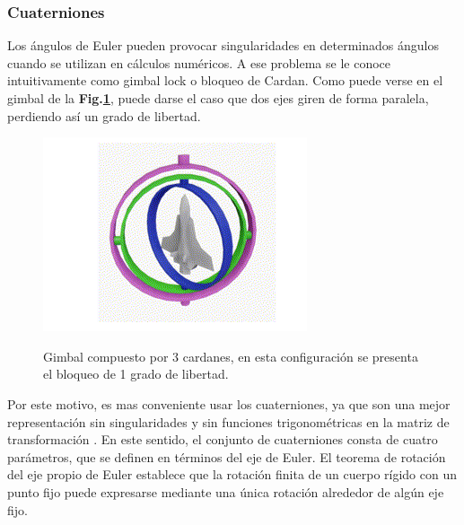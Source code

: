 \subsubsection{Cuaterniones}
\hfill \break
Los ángulos de Euler pueden provocar singularidades en determinados ángulos cuando se utilizan en cálculos numéricos. A ese problema se le conoce intuitivamente como gimbal lock o bloqueo de Cardan. Como puede verse en el gimbal de la \textbf{Fig.\ref{fig:gimbal}}, puede darse el caso que dos ejes giren de forma paralela, perdiendo así un grado de libertad.

\begin{figure}[!ht]
	\begin{center}
		\includegraphics[scale=0.8]{imagenes/marco_teorico/gimbal.PNG}\\
	\end{center}
	\caption{ Gimbal compuesto por 3 cardanes, en esta configuración se presenta el bloqueo de 1 grado de libertad. }
	\label{fig:gimbal}
\end{figure}

Por este motivo, es mas conveniente usar los cuaterniones, ya que son una mejor representación sin singularidades y sin funciones trigonométricas en la matriz de transformación \cite{wertz1978spacecraft}. En este sentido, el conjunto de cuaterniones consta de cuatro parámetros, que se definen en términos del eje de Euler. El teorema de rotación del eje propio de Euler establece que la rotación finita de un cuerpo rígido con un punto fijo puede expresarse mediante una única rotación alrededor de algún eje fijo.

